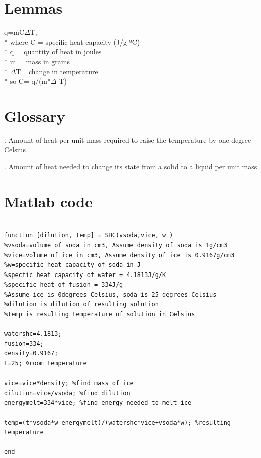 \documentclass[oneside,12pt]{report}
\begin{document}
%
%
%
%
%
%


\appendix
{}

\chapter{Lemmas}\label{Lemma}
\vspace{12pt} 

q=mC$\Delta$T,
\\*  where C = specific heat capacity (J/g ºC)
\\* q = quantity of heat in joules 
\\* m = mass in grams
\\* $\Delta$T= change in temperature
\\*  so C= q/(m*$\Delta$ T)

\chapter{Glossary}\label{Glossary}

\vspace{10pt} 

\vspace{8pt}
. Amount of heat per unit mass required to raise the temperature by one degree Celsius

. Amount of heat needed to change its state from a solid to a liquid per unit mass

\chapter{Matlab code}\label{Matlab code}
\begin{lstlisting}[caption= Matlab code for calculating resulting temperature and dilution, label = matlab]

function [dilution, temp] = SHC(vsoda,vice, w )
%vsoda=volume of soda in cm3, Assume density of soda is 1g/cm3
%vice=volume of ice in cm3, Assume density of ice is 0.9167g/cm3
%w=specific heat capacity of soda in J
%specfic heat capacity of water = 4.1813J/g/K
%specific heat of fusion = 334J/g
%Assume ice is 0degrees Celsius, soda is 25 degrees Celsius
%dilution is dilution of resulting solution
%temp is resulting temperature of solution in Celsius

watershc=4.1813;
fusion=334;
density=0.9167;
t=25; %room temperature

vice=vice*density; %find mass of ice
dilution=vice/vsoda; %find dilution
energymelt=334*vice; %find energy needed to melt ice

temp=(t*vsoda*w-energymelt)/(watershc*vice+vsoda*w); %resulting temperature

end
\end{lstlisting}
\vspace{5pt}
\end{document}

